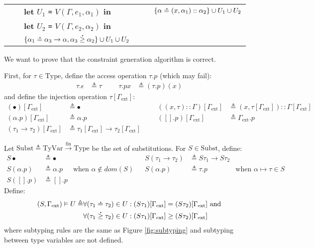 \documentclass{article}
\theoremstyle{definition}
\newcommand*{\cons}{::}
\newcommand*{\A}[1]{\overset{\,_{\mbox{\Large .}}}{#1}}
\newcommand*{\fin}[2]{{#1}\xrightarrow{\text{fin}}{#2}}
\newcommand*{\TyVar}{\text{TyVar}}
\newcommand*{\Type}{\text{Type}}
\newcommand*{\Subst}{\text{Subst}}
\newcommand*{\external}{\Gamma_{\text{ext}}}
\begin{document}
\begin{tabular}{rclrcl}
	                               &              & \textbf{let} $U_1$ \texttt{=} $V(\Gamma,e_1,\alpha_1)$ \textbf{in}                   &                                            &              & $\{\alpha\A{=}(x,\alpha_1)\cons\alpha_2\}\cup U_1\cup U_2$                          \\
	                               &              & \textbf{let} $U_2$ \texttt{=} $V(\Gamma,e_2,\alpha_2)$ \textbf{in}                                                                                                                                                                     \\
	                               &              & $\{\alpha_1\A{=}\alpha_3\rightarrow\alpha,\alpha_3\A{\ge}\alpha_2\}\cup U_1\cup U_2$
\end{tabular}

\vphantom{}

We want to prove that the constraint generation algorithm is correct.

First, for $\tau\in\Type$, define the access operation $\tau.p$ (which may fail):
\begin{align*}
	\tau.\epsilon & \triangleq\tau &  &  & \tau.px & \triangleq(\tau.p)(x)
\end{align*}
and define the injection operation $\tau[\external]$:
\begin{align*}
	(\bullet)[\external]                 & \triangleq\bullet                                       &  &  & ((x,\tau)\cons\Gamma)[\external] & \triangleq(x,\tau[\external])\cons\Gamma[\external] \\
	(\alpha.p)[\external]                & \triangleq\alpha.p                                      &  &  & ([].p)[\external]                & \triangleq\external.p                               \\
	(\tau_1\rightarrow\tau_2)[\external] & \triangleq\tau_1[\external]\rightarrow\tau_2[\external]
\end{align*}

Let $\Subst\triangleq\fin{\TyVar}{\Type}$ be the set of substitutions.
For $S\in\Subst$, define:
\begin{align*}
	S\bullet    & \triangleq\bullet  &                                  &  & S(\tau_1\rightarrow\tau_2) & \triangleq S\tau_1\rightarrow S\tau_2                                      \\
	S(\alpha.p) & \triangleq\alpha.p & \text{when }\alpha\not\in dom(S) &  & S(\alpha.p)                & \triangleq \tau.p                     & \text{when }\alpha\mapsto\tau\in S \\
	S([].p)     & \triangleq [].p
\end{align*}
Define:
\begin{align*}
	(S,\external)\vDash U\triangleq & \forall(\tau_1\A{=}\tau_2)\in U:(S\tau_1)[\external]= (S\tau_2)[\external]\text{ and} \\
	                                & \forall(\tau_1\A{\ge}\tau_2)\in U:(S\tau_1)[\external]\ge(S\tau_2)[\external]
\end{align*}
where subtyping rules are the same as Figure \ref{fig:subtyping} and subtyping between type variables are not defined.
\end{document}
